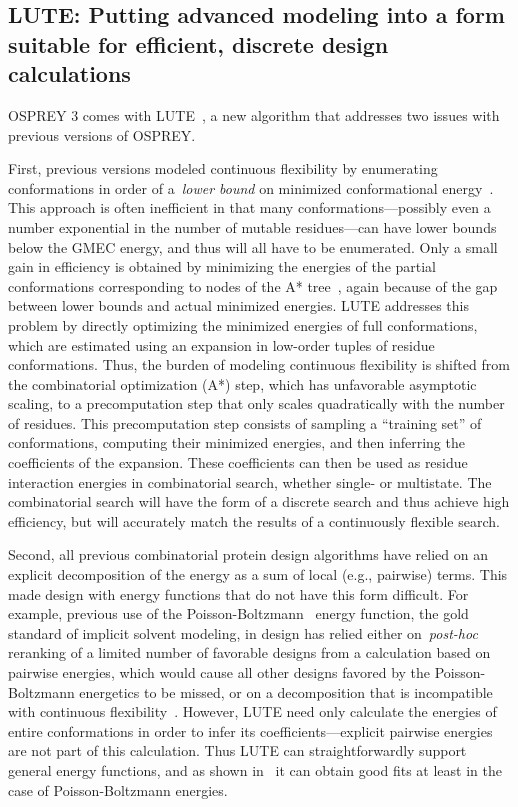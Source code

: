 \subsection{LUTE: Putting advanced modeling into a form suitable for efficient, discrete design calculations}

OSPREY 3 comes with LUTE~\cite{LUTE_RECOMB}, a new algorithm that addresses two issues with previous versions of OSPREY.  

First, previous versions modeled continuous flexibility by enumerating conformations in order of a~\textit{lower bound} on minimized conformational energy~\cite{minDEE,iMinDEE}.  This approach is often inefficient in that many conformations---possibly even a number exponential in the number of mutable residues---can have lower bounds below the GMEC energy, and thus will all have to be enumerated.  Only a small gain in efficiency is obtained by minimizing the energies of the partial conformations corresponding to nodes of the A* tree~\cite{EPIC}, again because of the gap between lower bounds and actual minimized energies.  LUTE addresses this problem by directly optimizing the minimized energies of full conformations, which are estimated using an expansion in low-order tuples of residue conformations.  Thus, the burden of modeling continuous flexibility is shifted from the combinatorial optimization (A*) step, which has unfavorable asymptotic scaling, to a precomputation step that only scales quadratically with the number of residues.  This precomputation step consists of sampling a ``training set'' of conformations, computing their minimized energies, and then inferring the coefficients of the expansion.  These coefficients can then be used as residue interaction energies in combinatorial search, whether single- or multistate.  The combinatorial search will have the form of a discrete search and thus achieve high efficiency, but will accurately match the results of a continuously flexible search.  

Second, all previous combinatorial protein design algorithms have relied on an explicit decomposition of the energy as a sum of local (e.g., pairwise) terms.  This made design with energy functions that do not have this form difficult. For example, previous use of the Poisson-Boltzmann~\cite{PBSA} energy function, the gold standard of implicit solvent modeling, in design has relied either on~\textit{post-hoc} reranking of a limited number of favorable designs from a calculation based on pairwise energies, which would cause all other designs favored by the Poisson-Boltzmann energetics to be missed, or on a decomposition that is incompatible with continuous flexibility~\cite{PB_pairwise}.  However, LUTE need only calculate the energies of entire conformations in order to infer its coefficients---explicit pairwise energies are not part of this calculation.  Thus LUTE can straightforwardly support general energy functions, and as shown in~\cite{LUTE_RECOMB} it can obtain good fits at least in the case of Poisson-Boltzmann energies.  

